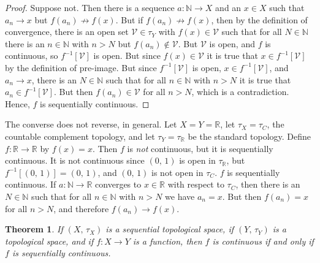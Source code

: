 \documentclass{article}
\theoremstyle{plain}
\newtheorem{theorem}{Theorem}[section]
\theoremstyle{normal}
\newenvironment{example}{%
    \pushQED{\qed}\renewcommand{\qedsymbol}{$\blacksquare$}\examplex%
}{%
    \popQED\endexamplex%
}
\begin{document}
        \begin{proof}
            Suppose not. Then there is a sequence
            $a:\mathbb{N}\rightarrow{X}$ and an $x\in{X}$ such that
            $a_{n}\rightarrow{x}$ but $f(a_{n})\not\rightarrow{f}(x)$.
            But if $f(a_{n})\not\rightarrow{f}(x)$, then by the definition of
            convergence, there is an open set $\mathcal{V}\in\tau_{Y}$ with
            $f(x)\in\mathcal{V}$ such
            that for all $N\in\mathbb{N}$ there is an $n\in\mathbb{N}$ with
            $n>N$ but $f(a_{n})\notin\mathcal{V}$. But $\mathcal{V}$ is open,
            and $f$ is continuous, so $f^{-1}[\mathcal{V}]$ is open.
            But since $f(x)\in\mathcal{V}$ it is true that
            $x\in{f}^{-1}[\mathcal{V}]$ by the definition of pre-image.
            But since $f^{-1}[\mathcal{V}]$ is open,
            $x\in{f}^{-1}[\mathcal{V}]$, and $a_{n}\rightarrow{x}$, there is
            an $N\in\mathbb{N}$ such that for all $n\in\mathbb{N}$ with
            $n>N$ it is true that $a_{n}\in{f}^{-1}[\mathcal{V}]$. But then
            $f(a_{n})\in\mathcal{V}$ for all $n>N$, which is a contradiction.
            Hence, $f$ is sequentially continuous.
        \end{proof}
        \begin{example}
            The converse does not reverse, in general. Let
            $X=Y=\mathbb{R}$, let $\tau_{X}=\tau_{C}$, the countable complement
            topology, and let $\tau_{Y}=\tau_{\mathbb{R}}$ be the
            standard topology. Define $f:\mathbb{R}\rightarrow\mathbb{R}$
            by $f(x)=x$. Then $f$ is \textit{not} continuous, but it is
            sequentially continuous. It is not continuous since
            $(0,\,1)$ is open in $\tau_{\mathbb{R}}$, but
            $f^{-1}[(0,\,1)]=(0,\,1)$, and $(0,\,1)$ is not open in
            $\tau_{C}$. $f$ is sequentially continuous. If
            $a:\mathbb{N}\rightarrow\mathbb{R}$ converges to
            $x\in\mathbb{R}$ with respect to $\tau_{C}$, then there is an
            $N\in\mathbb{N}$ such that for all $n\in\mathbb{N}$ with $n>N$
            we have $a_{n}=x$. But then $f(a_{n})=x$ for all
            $n>N$, and therefore $f(a_{n})\rightarrow{f}(x)$.
        \end{example}
        \begin{theorem}
            If $(X,\,\tau_{X})$ is a sequential topological space, if
            $(Y,\,\tau_{Y})$ is a topological space, and if
            $f:X\rightarrow{Y}$ is a function, then $f$ is continuous if and
            only if $f$ is sequentially continuous.
        \end{theorem}
\end{document}

